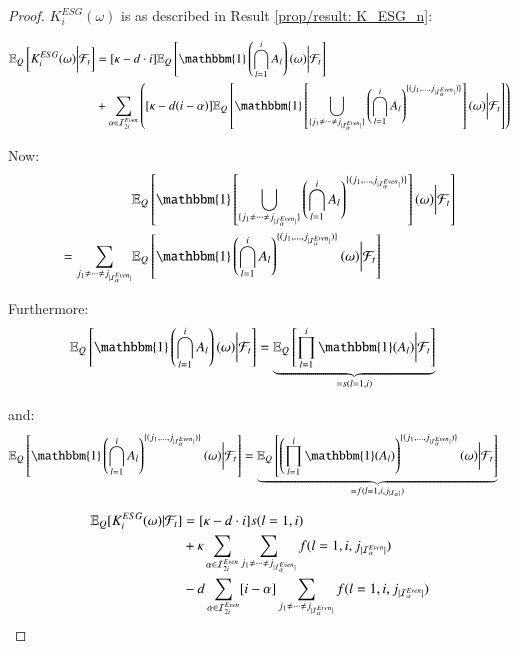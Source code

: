 \begin{proof}

$K_{i}^{ESG}(\omega)$ is as described in Result \ref{prop/result: K_ESG_n}: 

\begin{align*}
\E_{Q}\left[K_{i}^{ESG}(\omega)
\bigg{|}\F_{t}\right]
&= 
[\kappa - d\cdot i]\E_{Q}\left[
\mathbbm{1}\left(
\bigcap_{l=1}^{i}A_{l}
\right)(\omega)\bigg{|}\F_{t}
\right] \\ 
&+
\sum_{\alpha \in \mathcal{I}_{2i}^{Even}}
\left(
[\kappa - d(i-\alpha)]
\E_{Q}\left[
\mathbbm{1}\left[
\bigcup_{\{
j_{1}\neq \dots \neq j_{|\mathcal{I}_{\alpha}^{Even}|}
\}
}
\left(
\bigcap_{l=1}^{i}
A_{l}
\right)
^{
\{
(j_{1}, \dots , j_{|\mathcal{I}_{\alpha}^{Even}|})
\}
}
\right](\omega)
\bigg{|}\F_{t}
\right]
\right)
\end{align*}

Now: 
\begin{align*}
&\E_{Q}\left[
\mathbbm{1}\left[
\bigcup_{\{
j_{1}\neq \dots \neq j_{|\mathcal{I}_{\alpha}^{Even}|}
\}
}
\left(
\bigcap_{l=1}^{i}
A_{l}
\right)^{
\{
(j_{1}, \dots , j_{|\mathcal{I}_{\alpha}^{Even}|})
\}
}
\right](\omega)
\bigg{|}\F_{t}
\right] \\
= 
\sum_{
j_{1}\neq \dots \neq j_{|\mathcal{I}_{\alpha}^{Even}|}
}
&\E_{Q}\left[
\mathbbm{1}\left(
\bigcap_{l=1}^{i}A_{l}
\right)^{
\{
(j_{1}, \dots, j_{|\mathcal{I}_{\alpha}^{Even}|})
\}
}
(\omega)
\bigg{|}\F_{t}
\right]
\end{align*}

Furthermore: 
\begin{align*}
\E_{Q}\left[
\mathbbm{1}\left(
\bigcap_{l=1}^{i}A_{l}
\right)(\omega)\bigg{|}\F_{t}
\right] 
&= \underbrace{
\E_{Q}\left[
\prod_{l=1}^{i}\mathbbm{1}(A_{l})\bigg{|}\F_{t}
\right]
}_{= s(l=1, i)}
\end{align*}

and:
\begin{align*}
\E_{Q}\left[
\mathbbm{1}\left(
\bigcap_{l=1}^{i}A_{l}
\right)^{
\{
(j_{1}, \dots, j_{|\mathcal{I}_{\alpha}^{Even}|})
\}
}(\omega)
\bigg{|}\F_{t}
\right] 
&= \underbrace{
\E_{Q}\left[
\left(
\prod_{l=1}^{i}\mathbbm{1}(A_{l})
\right)^{
\{
(j_{1}, \dots, j_{|\mathcal{I}_{\alpha}^{Even}|})
\}
}
(\omega)
\bigg{|}\F_{t}
\right]
}_{= f(l=1, i, j_{|\mathcal{I}_{\alpha}|})}
\end{align*}

\begin{align*}
\mathbb{E}_{Q}[K_{i}^{ESG}(\omega)|\mathcal{F}_{t}]
&= 
[\kappa -d\cdot i]s(l=1,i) \\
&+ 
\kappa \sum_{\alpha \in \mathcal{I}_{2i}^{Even}}
\sum_{
j_{1}\neq \dots \neq j_{|\mathcal{I}_{\alpha}^{Even}|}
}
f(l=1, i, j_{|\mathcal{I}_{\alpha}^{Even}|}) \\ 
&-
d\sum_{\alpha \in \mathcal{I}_{2i}^{Even}}
[i-\alpha]\sum_{
j_{1}\neq \dots \neq j_{|\mathcal{I}_{\alpha}^{Even}|}
}
f(l=1, i, j_{|\mathcal{I}_{\alpha}^{Even}|})
\end{align*}


\end{proof}
